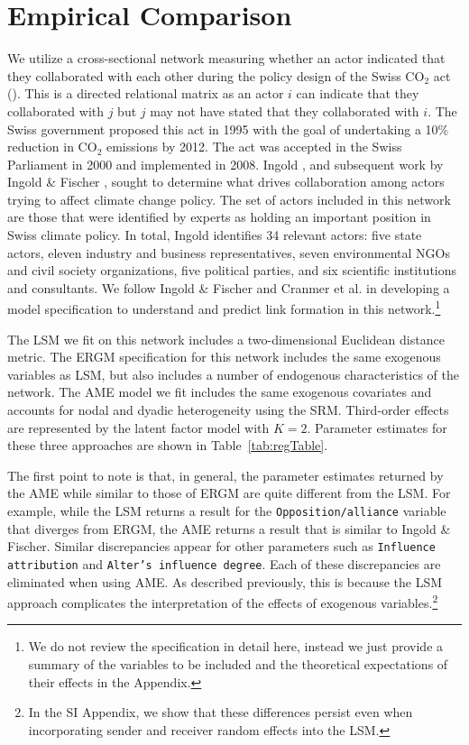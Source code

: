 \section*{\textbf{Empirical Comparison}}

We utilize a cross-sectional network measuring whether an actor indicated that they collaborated with each other during the policy design of the Swiss CO$_{2}$ act (\citealt{ingold:2008}). This is a directed relational matrix as an actor $i$ can indicate that they collaborated with $j$ but $j$ may not have stated that they collaborated with $i$. The Swiss government proposed this act in 1995 with the goal of undertaking a 10\% reduction in CO$_{2}$ emissions by 2012. The act was accepted in the Swiss Parliament in 2000 and implemented in 2008. Ingold \cite{ingold:2008}, and subsequent work by Ingold \& Fischer \cite{ingold:fischer:2014}, sought to determine what drives collaboration among actors trying to affect climate change policy. The set of actors included in this network are those that were identified by experts as holding an important position in Swiss climate policy. In total, Ingold identifies 34 relevant actors: five state actors, eleven industry and business representatives, seven environmental NGOs and civil society organizations, five political parties, and six scientific institutions and consultants. We follow Ingold \& Fischer and Cranmer et al. \cite{cranmer:etal:2016} in developing a model specification to understand and predict link formation in this network.\footnote{We do not review the specification in detail here, instead we just provide a summary of the variables to be included and the theoretical expectations of their effects in the Appendix.}

The LSM we fit on this network includes a two-dimensional Euclidean distance metric. The ERGM specification for this network includes the same exogenous variables as LSM, but also includes a number of endogenous characteristics of the network. The AME model we fit includes the same exogenous covariates and accounts for nodal and dyadic heterogeneity using the SRM. Third-order effects are represented by the latent factor model with $K=2$. Parameter estimates for these three approaches are shown in Table~\ref{tab:regTable}.

The first point to note is that, in general, the parameter estimates returned by the AME while similar to those of ERGM are quite different from the LSM. For example, while the LSM returns a result for the \texttt{Opposition/alliance} variable that diverges from ERGM, the AME returns a result that is similar to Ingold \& Fischer. Similar discrepancies appear for other parameters such as \texttt{Influence attribution} and \texttt{Alter's influence degree}. Each of these discrepancies are eliminated when using AME. As described previously, this is because the LSM approach complicates the interpretation of the effects of exogenous variables.\footnote{In the SI Appendix, we show that these differences persist even when incorporating sender and receiver random effects into the LSM.}

